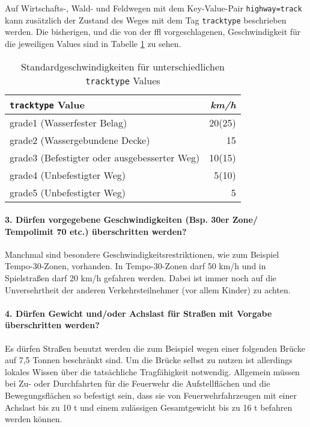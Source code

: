 Auf Wirtschafts-, Wald- und Feldwegen mit dem Key-Value-Pair \texttt{highway=track} kann zusätzlich der Zustand des Weges mit dem Tag \texttt{tracktype} beschrieben werden.
Die bisherigen, und die von der \gls{ffl} vorgeschlagenen, Geschwindigkeit für die jeweiligen Values sind in Tabelle \ref{tab:speedinfotrack} zu sehen.

\begin{table}[h]
\centering
\caption{Standardgeschwindigkeiten für unterschiedlichen \texttt{tracktype} Values}
\label{tab:speedinfotrack}
\begin{tabular}{|l|r|}
\hline
\texttt{tracktype} Value & \textit{km/h} \\
\hline
grade1 (Wasserfester Belag) & 20(25)   \\
grade2 (Wassergebundene Decke) & 15  \\
grade3 (Befestigter oder ausgebesserter Weg) & 10(15)  \\
grade4 (Unbefestigter Weg) & 5(10)   \\
grade5 (Unbefestigter Weg) & 5   \\
\hline
\end{tabular}
\end{table}

\paragraph*{3. Dürfen vorgegebene Geschwindigkeiten (Bsp. 30er Zone/ Tempolimit 70 etc.) überschritten werden?}
\label{frage3}
\par
Manchmal sind besondere Geschwindigkeitsrestriktionen, wie zum Beispiel Tempo-30-Zonen, vorhanden.
In Tempo-30-Zonen darf 50 km/h und in Spielstraßen darf 20 km/h gefahren werden.
Dabei ist immer noch auf die Unversehrtheit der anderen Verkehrsteilnehmer (vor allem Kinder) zu achten.

\paragraph*{4. Dürfen Gewicht und/oder Achslast für Straßen mit Vorgabe überschritten werden?}
\label{frage4}
\par
Es dürfen Straßen benutzt werden die zum Beispiel wegen einer folgenden Brücke auf 7,5 Tonnen beschränkt sind.
Um die Brücke selbst zu nutzen ist allerdings lokales Wissen über die tatsächliche Tragfähigkeit notwendig.
Allgemein müssen bei Zu- oder Durchfahrten für die Feuerwehr die Aufstellflächen und die Bewegungsflächen so befestigt sein, dass sie von Feuerwehrfahrzeugen mit einer Achslast bis zu 10 t und einem zulässigen Gesamtgewicht bis zu 16 t befahren werden können.

